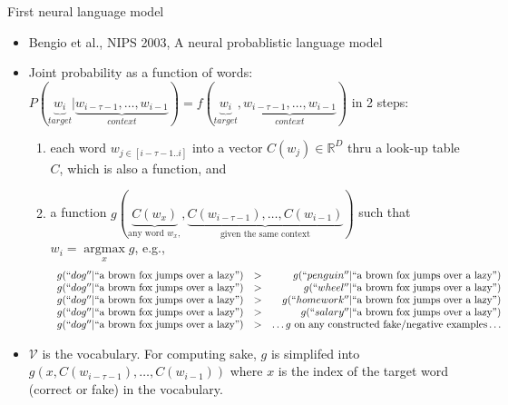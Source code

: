 \documentclass[11pt,handout]{beamer}
\DeclareMathOperator*{\argmax}{argmax}
\begin{document}
\begin{frame}{First neural language model}
\begin{itemize}[<+->]
 \item Bengio et al., NIPS 2003, A neural probablistic language model 
 \item Joint probability as a function of words:  $P(\underbrace{w_i}_{target}|\underbrace{w_{i-\tau-1}, \dots,w_{i-1}}_{context}) = f(\underbrace{w_i}_{target}, \underbrace{w_{i-\tau-1}, \dots, w_{i-1}}_{context})$
in 2 steps: 
\begin{enumerate}
 \item each word $w_{j\in[i-\tau-1..i]}$ into a vector $C(w_j)\in \mathbb{R}^D$ thru a look-up table $C$, which is also a function, and 
 \item a function $g(\underbrace{C(w_x)}_{\text{any word }w_x,}, \underbrace{C(w_{i-\tau-1}), \dots, C(w_{i-1})}_{\text{given the same  context}})$ such that $w_i = \argmax\limits_x g$, %
 e.g., 
 {\tiny 
  $$
 \begin{array}{lcr}
   g(``dog''|\text{``a brown fox jumps over a lazy''}) & > & g(``penguin''|\text{``a brown fox jumps over a lazy''}) \\
   g(``dog''|\text{``a brown fox jumps over a lazy''}) & > & g(``wheel''|\text{``a brown fox jumps over a lazy''}) \\
   g(``dog''|\text{``a brown fox jumps over a lazy''}) & > & g(``homework''|\text{``a brown fox jumps over a lazy''}) \\
   g(``dog''|\text{``a brown fox jumps over a lazy''}) & > & g(``salary''|\text{``a brown fox jumps over a lazy''}) \\
   g(``dog''|\text{``a brown fox jumps over a lazy''}) & > & \dots g \text{ on any constructed  fake/negative examples} \dots 
 \end{array}
 $$
 }
\end{enumerate}
 
 \item $\mathcal{V}$ is the vocabulary. For computing sake, $g$ is simplifed into $g(x, C(w_{i-\tau-1}), \dots, C(w_{i-1}))$ where $x$ is the index of the target word (correct or fake) in the vocabulary. 
\end{itemize}
\end{frame}
\end{document}
